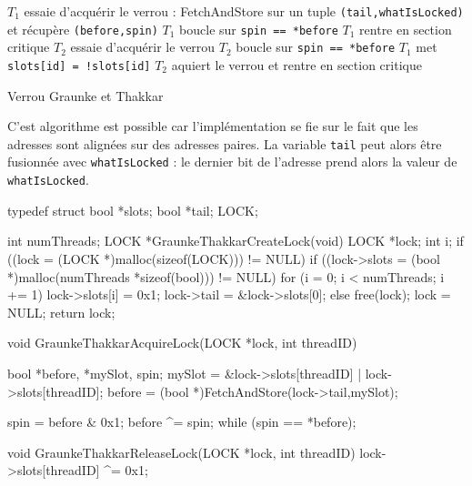 \documentclass[11pt,a4paper]{report}
\begin{document}
\begin{algorithm}[h] %
    $T_1$ essaie d'acquérir le verrou : FetchAndStore sur un tuple \texttt{(tail,whatIsLocked)} et récupère \texttt{(before,spin)}\;
    $T_1$ boucle sur \texttt{spin == *before} 
    $T_1$ rentre en section critique\;
    $T_2$ essaie d'acquérir le verrou\;
    $T_2$ boucle sur \texttt{spin == *before} 
    $T_1$ met \texttt{slots[id] = !slots[id]}
    $T_2$ aquiert le verrou et rentre en section critique\;
    \caption{Verrou Graunke et Thakkar}
    \label{algo:verrou-graunke-thakkar}
\end{algorithm} %

C'est algorithme est possible car l'implémentation se fie sur le fait que les adresses sont alignées sur des adresses paires. La variable \texttt{tail} peut alors être fusionnée avec \texttt{whatIsLocked} : le dernier bit de l'adresse prend alors la valeur de \texttt{whatIsLocked}.

\begin{ccode}
    typedef struct
    {
        bool *slots;
        bool *tail;
    } LOCK;

    int numThreads;
    LOCK *GraunkeThakkarCreateLock(void)
    {
        LOCK *lock;
        int i;
        if ((lock = (LOCK *)malloc(sizeof(LOCK))) != NULL)
            if ((lock->slots = (bool *)malloc(numThreads *sizeof(bool))) != NULL)
            {
                for (i = 0; i < numThreads; i += 1)
                    lock->slots[i] = 0x1;
                lock->tail = &lock->slots[0];
            }
            else
            {
                free(lock); lock = NULL;
            }
        return lock;
    }

    void GraunkeThakkarAcquireLock(LOCK *lock, int threadID)
    {
        bool *before, *mySlot, spin;
        mySlot = &lock->slots[threadID] | lock->slots[threadID];
        before = (bool *)FetchAndStore(lock->tail,mySlot);
        
        spin = before & 0x1;
        before ^= spin;
        while (spin == *before);
    }

    void GraunkeThakkarReleaseLock(LOCK *lock, int threadID)
    {
        lock->slots[threadID] ^= 0x1;
    }
\end{ccode}

\end{document}
